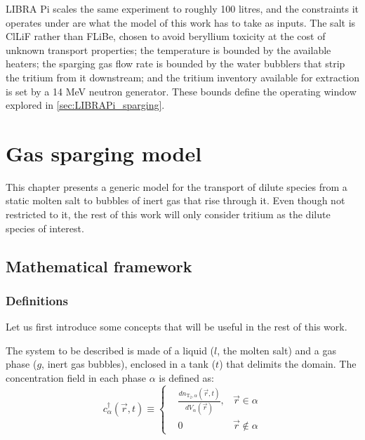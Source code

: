 \documentclass[a4paper,11pt,oneside]{report}
\begin{document}
LIBRA Pi scales the same experiment to roughly 100 litres, and the constraints it operates under are what the model of this work has to take as inputs. The salt is ClLiF rather than FLiBe, chosen to avoid beryllium toxicity at the cost of unknown transport properties; the temperature is bounded by the available heaters; the sparging gas flow rate is bounded by the water bubblers that strip the tritium from it downstream; and the tritium inventory available for extraction is set by a 14 MeV neutron generator. These bounds define the operating window explored in \cref{sec:LIBRAPi_sparging}.

\chapter{Gas sparging model}
\label{sec:sparging_model}


This chapter presents a generic model for the transport of dilute species from a static molten salt to bubbles of inert gas that rise through it. Even though not restricted to it, the rest of this work will only consider tritium as the dilute species of interest. 

\section{Mathematical framework}
\label{sec:sparging_maths}

\subsection{Definitions}
\label{sec:generic_definitions}

Let us first introduce some concepts that will be useful in the rest of this work.

The system to be described is made of a liquid ($l$, the molten salt) and a gas phase ($g$, inert gas bubbles), enclosed in a tank ($t$) that delimits the domain. The concentration field in each phase $\alpha$ is defined as:
\begin{equation}
    c^\dag_\alpha(\vec r,t)\equiv \left \{ \begin{array}{rcl}
         &  \frac{d n_{\mathrm{T_2},\alpha}(\vec r,t)}{d V_\alpha(\vec r)} , & \vec r\in\alpha\\
         &  0 & \vec r \notin \alpha
    \end{array}\right.
\end{equation}
\end{document}
